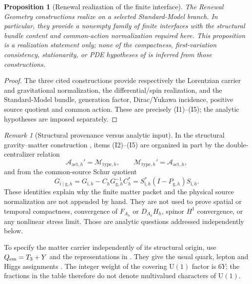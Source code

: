 \documentclass[11pt]{article}
\numberwithin{equation}{section}
\newtheorem{proposition}[proposition]{Proposition}
\theoremstyle{definition}
\theoremstyle{remark}
\newtheorem{remark}[remark]{Remark}
\newcommand{\U}{\mathrm U}
\newcommand{\A}{\mathcal A}
\newcommand{\M}{\mathcal M}
\begin{document}
\label{subsec:SM-packet}
\begin{proposition}[Renewal realization of the finite interface]
\label{prop:renewal-interface}
The Renewal Geometry constructions \cite{PelissierRenewalSpacetime2026,PelissierSpectral2026,PelissierDuality2026} realize  on a selected Standard-Model branch.  In particular, they provide a nonempty family of finite interfaces with the structural bundle content and common-action normalization required here.  This proposition is a realization statement only; none of the compactness, first-variation consistency, stationarity, or PDE hypotheses of  is inferred from those constructions.
\end{proposition}
\begin{proof}
The three cited constructions provide respectively the Lorentzian carrier
and gravitational normalization, the differential/spin realization, and the
Standard-Model bundle, generation factor, Dirac/Yukawa incidence, positive
source quotient and common action. These are precisely
\textup{(I1)}--\textup{(I5)}; the analytic hypotheses are imposed separately.
\end{proof}

\begin{remark}[Structural provenance versus analytic input]
\label{rem:structural-provenance}
In the structural gravity--matter construction \cite{PelissierDuality2026}, items \textup{(I2)}--\textup{(I5)} are organized in part by the double-centralizer relation
\begin{equation}
 \A_{\mathrm{act},h}'=\M_{\mathrm{type},h},
 \qquad \M_{\mathrm{type},h}'=\A_{\mathrm{act},h},
 \label{eq:imported-duality}
\end{equation}
and from the common-source Schur quotient
\begin{equation}
 G_{\mathrm{i}\mid\mathrm g,h}
 =G_{\mathrm i,h}-C_hG_{\mathrm g,h}^{-1}C_h^*
 =S_{\mathrm i,h}^*(I-P_{\mathrm g,h})S_{\mathrm i,h}.
 \label{eq:source-schur}
\end{equation}
These identities explain why the finite matter packet and the physical source normalization are not appended by hand. They are not used to prove spatial or temporal compactness, convergence of $F_{A_h}$ or $D_{A_h}H_h$, spinor $H^1$ convergence, or any nonlinear stress limit. Those are analytic questions addressed independently below.
\end{remark}

To specify the matter carrier independently of its structural origin, use
$Q_{\rm em}=T_3+Y$ and the representations in .
They give the usual quark, lepton and Higgs assignments
\cite{ErlerFreitas2024}.  The integer weight of the covering $\U(1)$ factor
is $6Y$; the fractions in the table therefore do not denote multivalued
characters of $\U(1)$.
\end{document}
